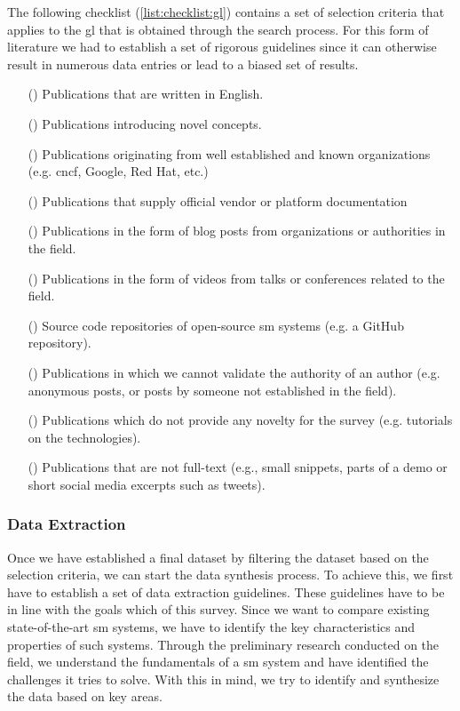 The following checklist (\cref{list:checklist:gl}) contains a set of selection criteria that applies to the \gls{gl} that is obtained through the search process. For this form of literature we had to establish a set of rigorous guidelines since it can otherwise result in numerous data entries or lead to a biased set of results. 

\begin{itemize}
    \item[(\cmark)] Publications that are written in English.
    \item[(\cmark)] Publications introducing novel concepts.
    \item[(\cmark)] Publications originating from well established and known organizations (e.g. \gls{cncf}, Google, Red Hat, etc.)
    \item[(\cmark)] Publications that supply official vendor or platform documentation
    \item[(\cmark)] Publications in the form of blog posts from organizations or authorities in the field.
    \item[(\cmark)] Publications in the form of videos from talks or conferences related to the field.
    \item[(\cmark)] Source code repositories of open-source \gls{sm} systems (e.g. a GitHub repository).
    
    \item[(\xmark)] Publications in which we cannot validate the authority of an author (e.g. anonymous posts, or posts by someone not established in the field). 
    \item[(\xmark)] Publications which do not provide any novelty for the survey (e.g. tutorials on the technologies). 
    \item[(\xmark)] Publications that are not full-text (e.g., small snippets, parts of a demo or short social media excerpts such as tweets).
    
    \label{list:checklist:gl}
\end{itemize}


\subsubsection{Data Extraction}
\label{sec:survey:methodology:review-protocol:data-extraction}


Once we have established a final dataset by filtering the dataset based on the selection criteria, we can start the data synthesis process. To achieve this, we first have to establish a set of data extraction guidelines. These guidelines have to be in line with the goals which of this survey. Since we want to compare existing state-of-the-art \gls{sm} systems, we have to identify the key characteristics and properties  of such systems. Through the preliminary research conducted on the field, we understand the fundamentals of a \gls{sm} system and have identified the challenges it tries to solve. With this in mind, we try to identify and synthesize the data based on key areas.


